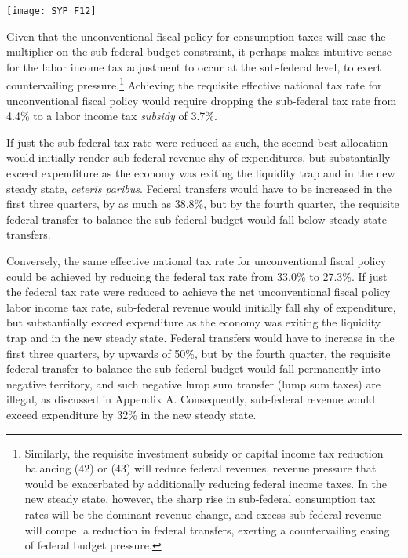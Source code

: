 \documentclass[12pt,letterpaper]{article}
\begin{document}
\begin{center}
\texttt{[image: SYP\_F12]}
\end{center}

Given that the unconventional fiscal policy for consumption taxes will ease the multiplier on the sub-federal budget constraint, it perhaps makes intuitive sense for the labor income tax adjustment to occur at the sub-federal level, to exert countervailing pressure.\footnote{Similarly, the requisite investment subsidy or capital income tax reduction balancing (42) or (43) will reduce federal revenues, revenue pressure that would be exacerbated by additionally reducing federal income taxes. In the new steady state, however, the sharp rise in sub-federal consumption tax rates will be the dominant revenue change, and excess sub-federal revenue will compel a reduction in federal transfers, exerting a countervailing easing of federal budget pressure.} Achieving the requisite effective national tax rate for unconventional fiscal policy would require dropping the sub-federal tax rate from 4.4\% to a labor income tax \textit{subsidy} of 3.7\%.  

If just the sub-federal tax rate were reduced as such, the second-best allocation would initially render sub-federal revenue shy of expenditures, but substantially exceed expenditure as the economy was exiting the liquidity trap and in the new steady state, \textit{ceteris paribus}. Federal transfers would have to be increased in the first three quarters, by as much as 38.8\%, but by the fourth quarter, the requisite federal transfer to balance the sub-federal budget would fall below steady state transfers. 

Conversely, the same effective national tax rate for unconventional fiscal policy could be achieved by reducing the federal tax rate from 33.0\% to 27.3\%. If just the federal tax rate were reduced to achieve the net unconventional fiscal policy labor income tax rate, sub-federal revenue would initially fall shy of expenditure, but substantially exceed expenditure as the economy was exiting the liquidity trap and in the new steady state. Federal transfers would have to increase in the first three quarters, by upwards of 50\%, but by the fourth quarter, the requisite federal transfer to balance the sub-federal budget would fall permanently into negative territory, and such negative lump sum transfer (lump sum taxes) are illegal, as discussed in Appendix A. Consequently, sub-federal revenue would exceed expenditure by 32\% in the new steady state.
\end{document}
